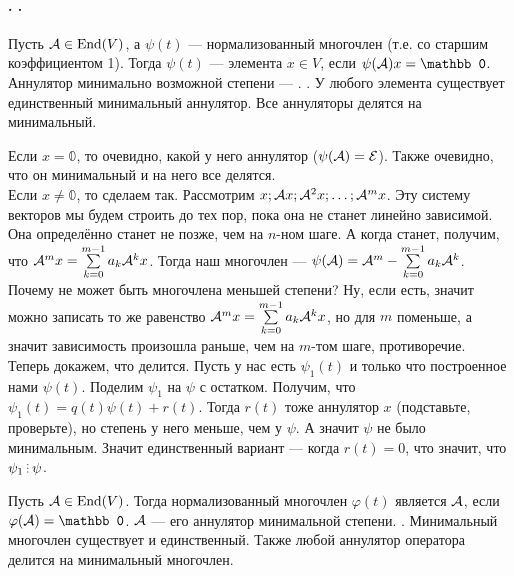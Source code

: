 \documentclass{article}
\newcommand{\id}{{\mathcal{E}}}
\begin{document}
    \paragraph{. .}
    \begin{itemize}
        \dfn Пусть ${\mathcal{A}}\in\operatorname{End}(V)$, а $\psi(t)$ --- нормализованный многочлен (т.е. со старшим коэффициентом 1). Тогда $\psi(t)$ ---  элемента $x\in V$, если $\psi(\scriptA)x=\mathbb 0$.
        \dfn Аннулятор минимально возможной степени --- .
        \thm {}. У любого элемента существует единственный минимальный аннулятор. Все аннуляторы делятся на минимальный.
        \begin{Proof}
            Если $x=\mathbb0$, то очевидно, какой у него аннулятор ($\psi(\scriptA)=\id$). Также очевидно, что он минимальный и на него все делятся.\\
            Если $x\neq\mathbb0$, то сделаем так. Рассмотрим $x;{\mathcal{A}} x;{\mathcal{A}}^2 x;\ldots;{\mathcal{A}}^m x$. Эту систему векторов мы будем строить до тех пор, пока она не станет линейно зависимой. Она определённо станет не позже, чем на $n$-ном шаге. А когда станет, получим, что ${\mathcal{A}}^m x=\sum\limits_{k=0}^{m-1}a_k{\mathcal{A}}^k x$. Тогда наш многочлен --- $\psi({\mathcal{A}})={\mathcal{A}}^m-\sum\limits_{k=0}^{m-1}a_k{\mathcal{A}}^k$. Почему не может быть многочлена меньшей степени? Ну, если есть, значит можно записать то же равенство ${\mathcal{A}}^m x=\sum\limits_{k=0}^{m-1}a_k{\mathcal{A}}^k x$, но для $m$ поменьше, а значит зависимость произошла раньше, чем на $m$-том шаге, противоречие.\\
            Теперь докажем, что делится. Пусть у нас есть $\psi_1(t)$ и только что построенное нами $\psi(t)$. Поделим $\psi_1$ на $\psi$ с остатком. Получим, что $\psi_1(t)=q(t)\psi(t)+r(t)$. Тогда $r(t)$ тоже аннулятор $x$ (подставьте, проверьте), но степень у него меньше, чем у $\psi$. А значит $\psi$ не было минимальным. Значит единственный вариант --- когда $r(t)=0$, что значит, что $\psi_1\divby\psi$.
        \end{Proof}
        \dfn Пусть ${\mathcal{A}}\in\operatorname{End}(V)$. Тогда нормализованный многочлен $\varphi(t)$ является  ${\mathcal{A}}$, если $\varphi(\scriptA)=\mathbb0$.
        \dfn {} ${\mathcal{A}}$ --- его аннулятор минимальной степени.
        \thm {}. Минимальный многочлен существует и единственный. Также любой аннулятор оператора делится на минимальный многочлен.

\end{itemize}
\end{document}
